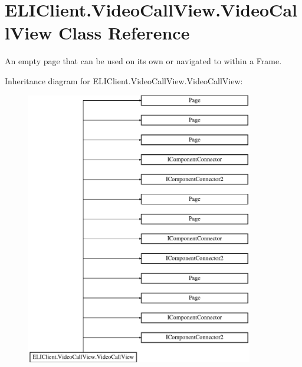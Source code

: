 \hypertarget{class_e_l_i_client_1_1_video_call_view_1_1_video_call_view}{}\section{E\+L\+I\+Client.\+Video\+Call\+View.\+Video\+Call\+View Class Reference}
\label{class_e_l_i_client_1_1_video_call_view_1_1_video_call_view}


An empty page that can be used on its own or navigated to within a Frame.  


Inheritance diagram for E\+L\+I\+Client.\+Video\+Call\+View.\+Video\+Call\+View\+:\begin{figure}[H]
\begin{center}
\leavevmode
\includegraphics[height=12.000000cm]{d2/d05/class_e_l_i_client_1_1_video_call_view_1_1_video_call_view}
\end{center}
\end{figure}
